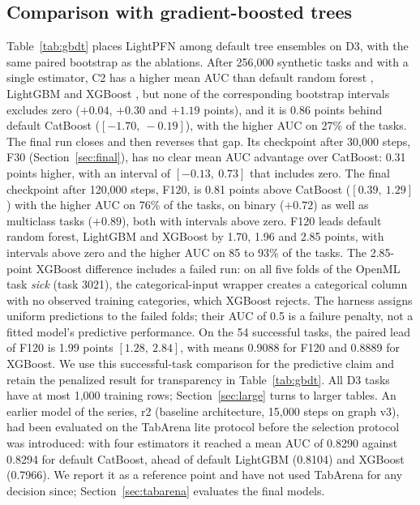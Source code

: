\documentclass[11pt]{article}
\begin{document}
\subsection{Comparison with gradient-boosted trees}
\label{sec:gbdt}
Table~\ref{tab:gbdt} places LightPFN among default tree ensembles on D3, with the same paired bootstrap
as the ablations. After 256,000 synthetic tasks and with a single estimator, C2 has a higher mean AUC
than default random forest \cite{breiman2001}, LightGBM \cite{ke2017} and XGBoost \cite{chen2016}, but
none of the corresponding bootstrap intervals excludes zero ($+0.04$, $+0.30$ and $+1.19$ points), and it
is 0.86 points behind default CatBoost \cite{prokhorenkova2018} ($[-1.70,\ -0.19]$), with the higher
AUC on 27\% of the tasks. The final run closes and then reverses that gap. Its checkpoint after
30,000 steps, F30 (Section~\ref{sec:final}), has no clear mean AUC advantage over CatBoost: 0.31 points higher, with an
interval of $[-0.13,\ 0.73]$ that includes zero. The final checkpoint after 120,000 steps, F120, is
0.81 points above CatBoost ($[0.39,\ 1.29]$) with the higher AUC on 76\% of the tasks, on binary
($+0.72$) as well as multiclass tasks ($+0.89$), both with intervals above zero. F120 leads default
random forest, LightGBM and XGBoost by 1.70, 1.96 and 2.85 points, with intervals above zero and the
higher AUC on 85 to 93\% of the tasks. The 2.85-point XGBoost difference includes a failed run: on all
five folds of the OpenML task \emph{sick} (task 3021), the categorical-input wrapper creates a
categorical column with no observed training categories, which XGBoost rejects. The harness assigns
uniform predictions to the failed folds; their AUC of 0.5 is a failure penalty, not a fitted model's
predictive performance. On the 54 successful tasks, the paired lead of F120 is 1.99 points
$[1.28,\ 2.84]$, with means 0.9088 for F120 and 0.8889 for XGBoost. We use this successful-task
comparison for the predictive claim and retain the penalized result for transparency in
Table~\ref{tab:gbdt}. All D3 tasks have at most 1,000 training rows; Section~\ref{sec:large} turns to
larger tables.
An earlier model of the series, r2
(baseline architecture, 15,000 steps on graph v3), had been evaluated on the TabArena lite protocol
before the selection protocol was introduced: with four estimators it reached a mean AUC of 0.8290
against 0.8294 for default CatBoost, ahead of default LightGBM (0.8104) and XGBoost (0.7966). We report
it as a reference point and have not used TabArena for any decision since; Section~\ref{sec:tabarena}
evaluates the final models.
\end{document}
